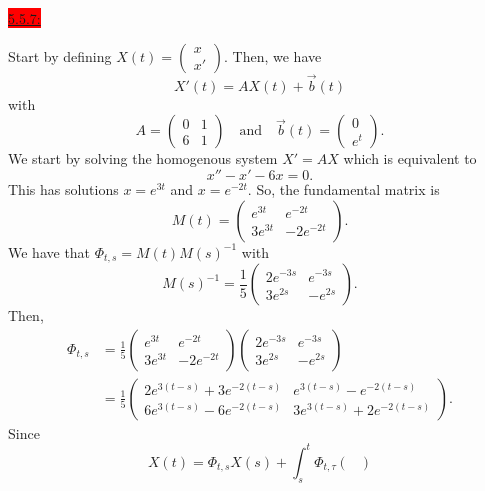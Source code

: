 \documentclass{exam}
\begin{document}
\colorbox{red}{\underline{5.5.7:}}
\begin{solution}
    Start by defining $X(t) = \left(\begin{smallmatrix} x \\ x' \end{smallmatrix}\right)$. Then, we have 
    \[
        X'(t) = AX(t) + \vec{b}(t) 
    \]
    with 
    \[
        A = \begin{pmatrix}
            0 & 1 \\
            6 & 1
        \end{pmatrix}
        \quad\text{and}\quad \vec{b}(t) = \begin{pmatrix}
            0 \\ e^t
        \end{pmatrix}.
    \]
    We start by solving the homogenous system $X' = AX$ which is equivalent to
    \[
        x'' - x' - 6x = 0.
    \]
    This has solutions $x=e^{3t}$ and $x=e^{-2t}$. So, the fundamental matrix is 
    \[
        M(t) = \begin{pmatrix}
            e^{3t} & e^{-2t} \\
            3e^{3t} & -2e^{-2t}
        \end{pmatrix}.
    \]
    We have that $\Phi_{t, s} = M(t)M(s)^{-1}$ with 
    \[
        M(s)^{-1} = \frac{1}{5}\begin{pmatrix}
            2e^{-3s} & e^{-3s} \\
            3e^{2s} & -e^{2s}
        \end{pmatrix}.
    \]
    Then, 
    \begin{align*}
        \Phi_{t, s} &= \frac{1}{5}\begin{pmatrix}
            e^{3t} & e^{-2t} \\
            3e^{3t} & -2e^{-2t}
        \end{pmatrix}
        \begin{pmatrix}
            2e^{-3s} & e^{-3s} \\
            3e^{2s} & -e^{2s}
        \end{pmatrix} \\
        &= \frac{1}{5}\begin{pmatrix}
            2e^{3(t-s)} + 3e^{-2(t-s)} & e^{3(t-s)} - e^{-2(t-s)} \\
            6e^{3(t-s)} - 6e^{-2(t-s)} & 3e^{3(t-s)} + 2e^{-2(t-s)}
        \end{pmatrix}.
    \end{align*}
    Since
    \[
        X(t) = \Phi_{t, s}X(s) + \int_s^t \Phi_{t, \tau}\begin{pmatrix}

\end{pmatrix}\]
\end{solution}
\end{document}

